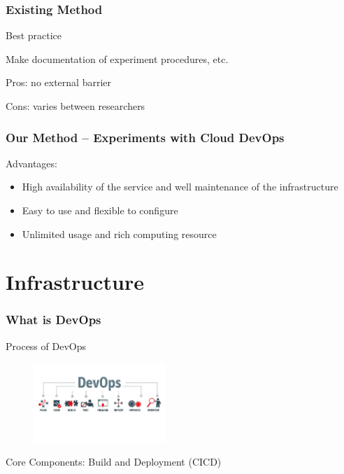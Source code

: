 \documentclass[notheorems]{beamer}
\begin{document}
\begin{frame}
\frametitle{Existing Method}
Best practice

Make documentation of experiment procedures, etc.

Pros: no external barrier

Cons: varies between researchers
\end{frame}

\begin{frame}
\frametitle{Our Method -- Experiments with Cloud DevOps}
Advantages:
\begin{itemize}
	\item High availability of the service and well maintenance of the infrastructure
	\item Easy to use and flexible to configure
	\item Unlimited usage and rich computing resource
\end{itemize}
\end{frame}
\frame{\tableofcontents[currentsection]}
\section{Infrastructure}
\begin{frame}
\frametitle{What is DevOps}

Process of DevOps
\begin{figure}
\includegraphics[width=5cm]{pic/what-is-devops.jpg}
\end{figure}
Core Components: Build and Deployment (CICD)
\end{frame}
\end{document}

